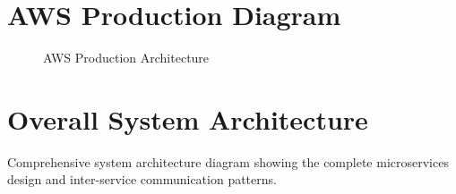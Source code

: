 \begin{appendices}
    \section{AWS Production Diagram}
    \begin{figure}[H]
        \centering
        \caption{AWS Production Architecture}
        \label{fig:aws-production-architecture-appendix}
    \end{figure}
    \newpage

    \section{Overall System Architecture}
    Comprehensive system architecture diagram showing the complete microservices design and inter-service communication patterns.


\end{appendices}
